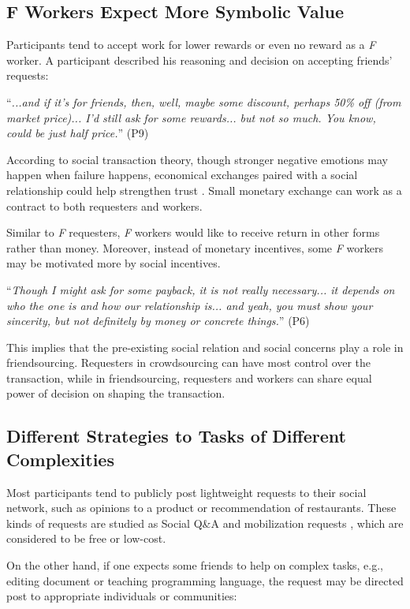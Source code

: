 \subsection{F Workers Expect More Symbolic Value}
Participants tend to accept work for lower rewards or even no reward as a \emph{F} worker. 
A participant described his reasoning and decision on accepting friends' requests:

``\emph{...and if it's for friends, then, well, maybe some discount, perhaps 50\% off (from market price)... 
I'd still ask for some rewards... but not so much. You know, could be just half price.}'' (P9)


According to social transaction theory,
though stronger negative emotions may happen when failure happens, 
economical exchanges paired with a social relationship could help strengthen trust \cite{Cropanzano:JoM05:SocExTheory}. 
Small monetary exchange can work as a contract to both requesters and workers. 

Similar to \emph{F} requesters, \emph{F} workers would like to receive return in other forms rather than money.
Moreover, instead of monetary incentives, some \emph{F} workers may be motivated more by social incentives. 

``\emph{Though I might ask for some payback, it is not really necessary... 
it depends on who the one is and how our relationship is... 
and yeah, you must show your sincerity, but not definitely by money or concrete things.}'' (P6)

This implies that the pre-existing social relation and social concerns play a role in friendsourcing. 
Requesters in crowdsourcing can have most control over the transaction, while in friendsourcing, 
requesters and workers can share equal power of decision on shaping the transaction. 


\subsection{Different Strategies to Tasks of Different Complexities}
Most participants tend to publicly post lightweight requests to their social network, 
such as opinions to a product or recommendation of restaurants.
These kinds of requests are studied as Social Q\&A \cite{Morris:CHI10:QABehavior} 
and mobilization requests \cite{Lampe:CSCW14:HelpOnWay}, which are considered to be free or low-cost.

On the other hand, if one expects some friends to help on complex tasks, 
e.g., editing document or teaching programming language, 
the request may be directed post to appropriate individuals or communities:

